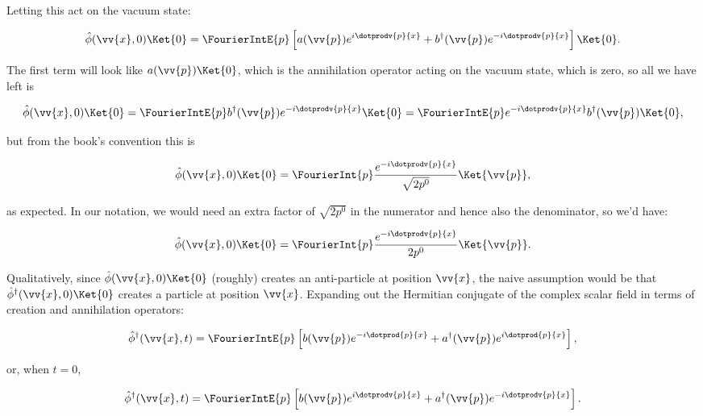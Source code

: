 \begin{parts}
Letting this act on the vacuum state:

\begin{equation*}
    \hat{\phi}(\vv{x},0) \Ket{0} = \FourierIntE{p} \left[ a(\vv{p})e^{i\dotprodv{p}{x}} + b^{\dagger}(\vv{p})e^{-i\dotprodv{p}{x}} \right] \Ket{0}.
\end{equation*}

The first term will look like $a(\vv{p})\Ket{0}$, which is the annihilation operator acting on the vacuum state, which is zero, so all we have left is

\begin{equation*}
    \hat{\phi}(\vv{x},0) \Ket{0} = \FourierIntE{p} b^{\dagger}(\vv{p})e^{-i\dotprodv{p}{x}} \Ket{0} = \FourierIntE{p} e^{-i\dotprodv{p}{x}} b^{\dagger}(\vv{p}) \Ket{0},
\end{equation*}

but from the book's convention this is

\begin{equation*}
    \hat{\phi}(\vv{x},0) \Ket{0} = \FourierInt{p} \frac{e^{-i\dotprodv{p}{x}}}{\sqrt{2p^0}} \Ket{\vv{p}},
\end{equation*}

as expected. In our notation, we would need an extra factor of $\sqrt{2p^0}$ in the numerator and hence also the denominator, so we'd have:

\begin{equation*}
    \hat{\phi}(\vv{x},0) \Ket{0} = \FourierInt{p} \frac{e^{-i\dotprodv{p}{x}}}{2p^0} \Ket{\vv{p}}.
\end{equation*}






\item Qualitatively, since $\hat{\phi}(\vv{x},0)\Ket{0}$ (roughly) creates an anti-particle at position $\vv{x}$, the naive assumption would be that $\hat{\phi}^{\dagger}(\vv{x},0)\Ket{0}$ creates a particle at position $\vv{x}$. Expanding out the Hermitian conjugate of the complex scalar field in terms of creation and annihilation operators:

\begin{equation*}
    \hat{\phi}^{\dagger}(\vv{x},t) = \FourierIntE{p} \left[ b(\vv{p})e^{-i\dotprod{p}{x}} + a^{\dagger}(\vv{p})e^{i\dotprod{p}{x}} \right],
\end{equation*}

or, when $t=0$, 

\begin{equation*}
    \hat{\phi}^{\dagger}(\vv{x},t) = \FourierIntE{p} \left[ b(\vv{p})e^{i\dotprodv{p}{x}} + a^{\dagger}(\vv{p})e^{-i\dotprodv{p}{x}} \right].
\end{equation*}


\end{parts}
